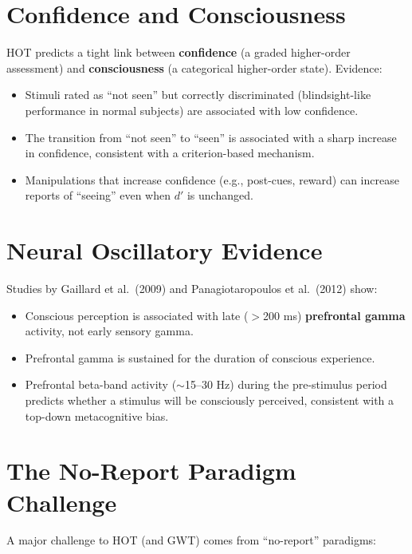 \documentclass[11pt,a4paper]{report}
\begin{document}
\section{Confidence and Consciousness}

HOT predicts a tight link between \textbf{confidence} (a graded higher-order assessment) and \textbf{consciousness} (a categorical higher-order state). Evidence:

\begin{itemize}[leftmargin=1.5em]
  \item Stimuli rated as ``not seen'' but correctly discriminated (blindsight-like performance in normal subjects) are associated with low confidence.
  \item The transition from ``not seen'' to ``seen'' is associated with a sharp increase in confidence, consistent with a criterion-based mechanism.
  \item Manipulations that increase confidence (e.g., post-cues, reward) can increase reports of ``seeing'' even when $d'$ is unchanged.
\end{itemize}

\section{Neural Oscillatory Evidence}

\begin{mechbox}
Studies by Gaillard et al.\ (2009) and Panagiotaropoulos et al.\ (2012) show:
\begin{itemize}[leftmargin=1.5em]
  \item Conscious perception is associated with late ($>$200 ms) \textbf{prefrontal gamma} activity, not early sensory gamma.
  \item Prefrontal gamma is sustained for the duration of conscious experience.
  \item Prefrontal beta-band activity ($\sim$15--30 Hz) during the pre-stimulus period predicts whether a stimulus will be consciously perceived, consistent with a top-down metacognitive bias.
\end{itemize}
\end{mechbox}

\section{The No-Report Paradigm Challenge}

A major challenge to HOT (and GWT) comes from ``no-report'' paradigms:
\end{document}
